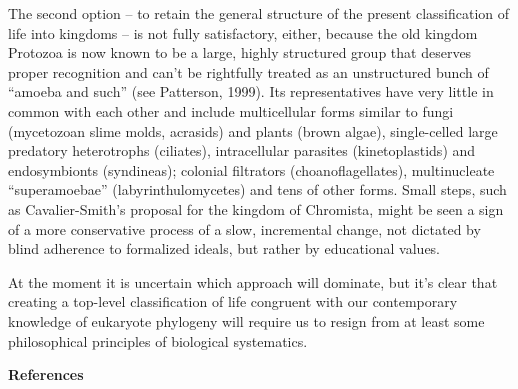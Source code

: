 \documentclass[a4paper]{article}
\begin{document}
The second option – to retain the general structure of the present classification of life into kingdoms – is not fully
satisfactory, either, because the old kingdom Protozoa is now known to be a large, highly structured group that
deserves proper recognition and can’t be rightfully treated as an unstructured bunch of “amoeba and such”
\label{ref:RNDBkv0g8EycM}(see Patterson, 1999). Its representatives have very little in common with each other and
include multicellular forms similar to fungi (mycetozoan slime molds, acrasids) and plants (brown algae), single-celled
large predatory heterotrophs (ciliates), intracellular parasites (kinetoplastids) and endosymbionts (syndineas);
colonial filtrators (choanoflagellates), multinucleate “superamoebae” (labyrinthulomycetes) and tens of other forms.
Small steps, such as Cavalier-Smith’s proposal for the kingdom of Chromista, might be seen a sign of a more
conservative process of a slow, incremental change, not dictated by blind adherence to formalized ideals, but rather by
educational values.

At the moment it is uncertain which approach will dominate, but it’s clear that creating a top-level classification of
life congruent with our contemporary knowledge of eukaryote phylogeny will require us to resign from at least some
philosophical principles of biological systematics.

{\bfseries
References}
\end{document}
